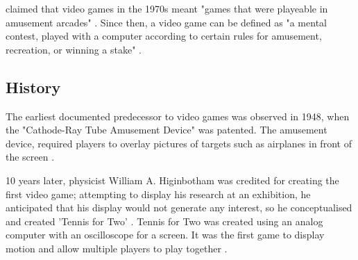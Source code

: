 \documentclass[a4paper,11.5pt]{report}
\numberwithin{figure}{section}
\numberwithin{table}{section}
\numberwithin{equation}{section}
\numberwithin{equation}{section}
\begin{document}
\citeauthor{Botturi2009} claimed that video games in the 1970s meant "games that were playeable in amusement arcades" \citep{Botturi2009}. Since then, a video game can be defined as "a mental contest, played with a computer according to certain rules for amusement, recreation, or winning a stake" \citep{Zyda2005}.


\subsection{History}


The earliest documented predecessor to video games was observed in 1948, when the "Cathode-Ray Tube Amusement Device" was patented. The amusement device, required players to overlay pictures of targets such as airplanes in front of the screen \citep{thefirstvideogame}.

10 years later, physicist William A. Higinbotham was credited for creating the first video game; attempting to display his research at an exhibition, he anticipated that his display would not generate any interest, so he conceptualised and created 'Tennis for Two' \citep{TennisForTwo}. Tennis for Two was created using an analog computer with an oscilloscope for a screen. It was the first game to display motion and allow multiple players to play together \citep{thefirstvideogame}. 

\end{document}
